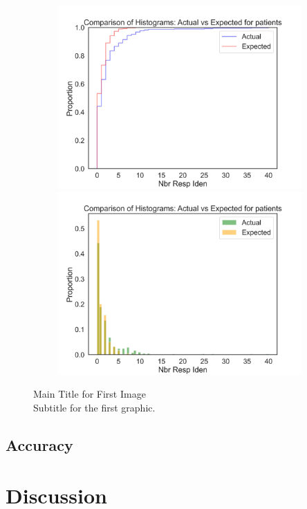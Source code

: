 \begin{figure}[H]
    \centering
    \includegraphics[width=12cm,height=7cm]{MainLayout/Images/chapter9/actual_expected_patients_ecdf.jpg}
    \includegraphics[width=12cm,height=7cm]{MainLayout/Images/chapter9/actual_expected_patients_hist.jpg}
    \caption{Main Title for First Image \\ \small Subtitle for the first graphic.}
    \label{fig:kernel_comparison_methods}
\end{figure}
\subsection{Accuracy} 

\section {Discussion} 

